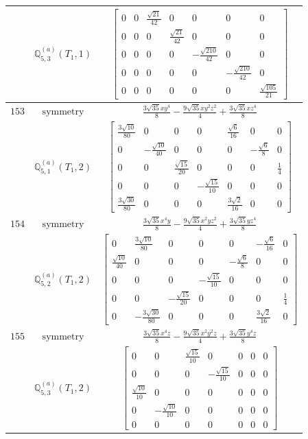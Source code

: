\documentclass[fleqn,8pt,landscape]{jsarticle}
\begin{document}
\begin{longtable}{ccc}
$  $ & $ \mathbb{Q}_{5,3}^{(a)}(T_{1},1) $ & $ \begin{bmatrix} 0 & 0 & \frac{\sqrt{21}}{42} & 0 & 0 & 0 & 0 \\ 0 & 0 & 0 & \frac{\sqrt{21}}{42} & 0 & 0 & 0 \\ 0 & 0 & 0 & 0 & - \frac{\sqrt{210}}{42} & 0 & 0 \\ 0 & 0 & 0 & 0 & 0 & - \frac{\sqrt{210}}{42} & 0 \\ 0 & 0 & 0 & 0 & 0 & 0 & \frac{\sqrt{105}}{21} \end{bmatrix} $ \\ \hline
$ 153 $ & $ \text{symmetry} $ & $ \frac{3 \sqrt{35} x y^{4}}{8} - \frac{9 \sqrt{35} x y^{2} z^{2}}{4} + \frac{3 \sqrt{35} x z^{4}}{8} $ \\
$  $ & $ \mathbb{Q}_{5,1}^{(a)}(T_{1},2) $ & $ \begin{bmatrix} \frac{3 \sqrt{10}}{80} & 0 & 0 & 0 & \frac{\sqrt{6}}{16} & 0 & 0 \\ 0 & - \frac{\sqrt{10}}{40} & 0 & 0 & 0 & - \frac{\sqrt{6}}{8} & 0 \\ 0 & 0 & \frac{\sqrt{15}}{20} & 0 & 0 & 0 & \frac{1}{4} \\ 0 & 0 & 0 & - \frac{\sqrt{15}}{10} & 0 & 0 & 0 \\ \frac{3 \sqrt{30}}{80} & 0 & 0 & 0 & \frac{3 \sqrt{2}}{16} & 0 & 0 \end{bmatrix} $ \\ \hline
$ 154 $ & $ \text{symmetry} $ & $ \frac{3 \sqrt{35} x^{4} y}{8} - \frac{9 \sqrt{35} x^{2} y z^{2}}{4} + \frac{3 \sqrt{35} y z^{4}}{8} $ \\
$  $ & $ \mathbb{Q}_{5,2}^{(a)}(T_{1},2) $ & $ \begin{bmatrix} 0 & \frac{3 \sqrt{10}}{80} & 0 & 0 & 0 & - \frac{\sqrt{6}}{16} & 0 \\ \frac{\sqrt{10}}{40} & 0 & 0 & 0 & - \frac{\sqrt{6}}{8} & 0 & 0 \\ 0 & 0 & 0 & - \frac{\sqrt{15}}{10} & 0 & 0 & 0 \\ 0 & 0 & - \frac{\sqrt{15}}{20} & 0 & 0 & 0 & \frac{1}{4} \\ 0 & - \frac{3 \sqrt{30}}{80} & 0 & 0 & 0 & \frac{3 \sqrt{2}}{16} & 0 \end{bmatrix} $ \\ \hline
$ 155 $ & $ \text{symmetry} $ & $ \frac{3 \sqrt{35} x^{4} z}{8} - \frac{9 \sqrt{35} x^{2} y^{2} z}{4} + \frac{3 \sqrt{35} y^{4} z}{8} $ \\
$  $ & $ \mathbb{Q}_{5,3}^{(a)}(T_{1},2) $ & $ \begin{bmatrix} 0 & 0 & \frac{\sqrt{15}}{10} & 0 & 0 & 0 & 0 \\ 0 & 0 & 0 & - \frac{\sqrt{15}}{10} & 0 & 0 & 0 \\ \frac{\sqrt{10}}{10} & 0 & 0 & 0 & 0 & 0 & 0 \\ 0 & - \frac{\sqrt{10}}{10} & 0 & 0 & 0 & 0 & 0 \\ 0 & 0 & 0 & 0 & 0 & 0 & 0 \end{bmatrix} $ \\ \hline

\end{longtable}
\end{document}
